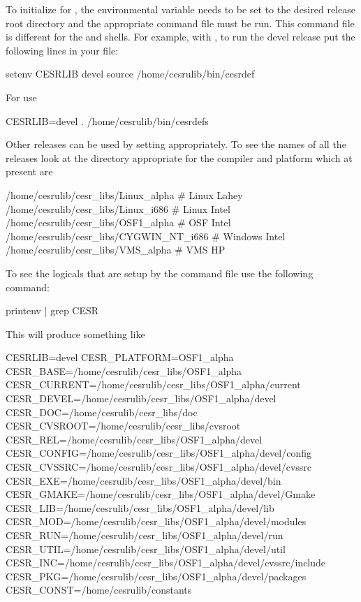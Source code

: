 To initialize for \bmad, the  environmental variable needs
to be set to the desired release root directory and the appropriate
command file must be run. This command file is different for the
 and  shells. For example, with , to run
the devel release put the following lines in your  file:
\begin{example}
  setenv CESRLIB devel
  source /home/cesrulib/bin/cesrdef
\end{example}
For  use
\begin{example}
    CESRLIB=devel
    . /home/cesrulib/bin/cesrdefs
\end{example}
Other releases can be used by setting  appropriately. To
see the names of all the releases look at the directory appropriate
for the compiler and platform which at present are
\begin{example}
  /home/cesrulib/cesr_libs/Linux_alpha       # Linux    Lahey
  /home/cesrulib/cesr_libs/Linux_i686        # Linux    Intel
  /home/cesrulib/cesr_libs/OSF1_alpha        # OSF      Intel
  /home/cesrulib/cesr_libs/CYGWIN_NT_i686    # Windows  Intel
  /home/cesrulib/cesr_libs/VMS_alpha         # VMS      HP
\end{example}

To see the logicals that are setup by the  command file
use the following command:
\begin{example}
  printenv | grep CESR
\end{example}
This will produce something like
\begin{example}
  CESRLIB=devel
  CESR_PLATFORM=OSF1_alpha
  CESR_BASE=/home/cesrulib/cesr_libs/OSF1_alpha
  CESR_CURRENT=/home/cesrulib/cesr_libs/OSF1_alpha/current
  CESR_DEVEL=/home/cesrulib/cesr_libs/OSF1_alpha/devel
  CESR_DOC=/home/cesrulib/cesr_libs/doc
  CESR_CVSROOT=/home/cesrulib/cesr_libs/cvsroot
  CESR_REL=/home/cesrulib/cesr_libs/OSF1_alpha/devel
  CESR_CONFIG=/home/cesrulib/cesr_libs/OSF1_alpha/devel/config
  CESR_CVSSRC=/home/cesrulib/cesr_libs/OSF1_alpha/devel/cvssrc
  CESR_EXE=/home/cesrulib/cesr_libs/OSF1_alpha/devel/bin
  CESR_GMAKE=/home/cesrulib/cesr_libs/OSF1_alpha/devel/Gmake
  CESR_LIB=/home/cesrulib/cesr_libs/OSF1_alpha/devel/lib
  CESR_MOD=/home/cesrulib/cesr_libs/OSF1_alpha/devel/modules
  CESR_RUN=/home/cesrulib/cesr_libs/OSF1_alpha/devel/run
  CESR_UTIL=/home/cesrulib/cesr_libs/OSF1_alpha/devel/util
  CESR_INC=/home/cesrulib/cesr_libs/OSF1_alpha/devel/cvssrc/include
  CESR_PKG=/home/cesrulib/cesr_libs/OSF1_alpha/devel/packages
  CESR_CONST=/home/cesrulib/constants
\end{example}

